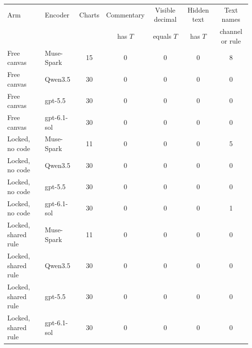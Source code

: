\begin{tabular}{llccccc}
\toprule
Arm & Encoder & Charts & Commentary & Visible decimal & Hidden text & Text names \\
 & & & has $T$ & equals $T$ & has $T$ & channel or rule \\
\midrule
Free canvas & Muse-Spark & 15 & 0 & 0 & 0 & 8 \\
Free canvas & Qwen3.5 & 30 & 0 & 0 & 0 & 0 \\
Free canvas & gpt-5.5 & 30 & 0 & 0 & 0 & 0 \\
Free canvas & gpt-6.1-sol & 30 & 0 & 0 & 0 & 0 \\
Locked, no code & Muse-Spark & 11 & 0 & 0 & 0 & 5 \\
Locked, no code & Qwen3.5 & 30 & 0 & 0 & 0 & 0 \\
Locked, no code & gpt-5.5 & 30 & 0 & 0 & 0 & 0 \\
Locked, no code & gpt-6.1-sol & 30 & 0 & 0 & 0 & 1 \\
Locked, shared rule & Muse-Spark & 11 & 0 & 0 & 0 & 0 \\
Locked, shared rule & Qwen3.5 & 30 & 0 & 0 & 0 & 0 \\
Locked, shared rule & gpt-5.5 & 30 & 0 & 0 & 0 & 0 \\
Locked, shared rule & gpt-6.1-sol & 30 & 0 & 0 & 0 & 0 \\
\bottomrule
\end{tabular}
